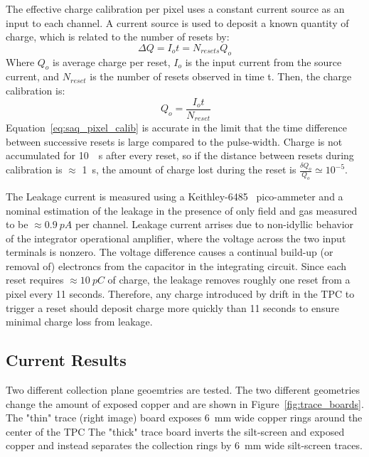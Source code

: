 The effective charge calibration per pixel uses a constant current source as an input to each channel.
A current source is used to deposit a known quantity of charge, which is related to the number of resets by:
\begin{equation}
 \Delta Q = I_{o}t = N_{resets}Q_{o}
\end{equation}
Where $Q_{o}$ is average charge per reset, $I_{o}$ is the input current from the source current, and $N_{reset}$ is the number of resets observed in time t.
Then, the charge calibration is:
\begin{equation}~\label{eq:saq_pixel_calib}
 Q_{o} = \frac{I_{o}t}{N_{reset}}
\end{equation}
Equation~\ref{eq:saq_pixel_calib} is accurate in the limit that the time difference between successive resets is large compared to the pulse-width.
Charge is not accumulated for 10~\unit{\mu s} after every reset, so if the distance between resets during calibration is $\approx$ 1~\unit{s}, the amount of charge lost during the reset is $\frac{\delta Q_{o}}{Q_{o}} \simeq 10^{-5}$.

The Leakage current is measured using a Keithley-6485~\citep{picoammeter-6485-datasheet} pico-ammeter and a nominal estimation of the leakage in the presence of only field and gas measured to be $\approx 0.9~\unit{pA}$ per channel.
Leakage current arrises due to non-idyllic behavior of the integrator operational amplifier, where the voltage across the two input terminals is nonzero.
The voltage difference causes a continual build-up (or removal of) electroncs from the capacitor in the integrating circuit.
Since each reset requires $\approx 10~\unit{pC}$ of charge, the leakage removes roughly one reset from a pixel every 11 seconds.
Therefore, any charge introduced by drift in the TPC to trigger a reset should deposit charge more quickly than 11 seconds to ensure minimal charge loss from leakage.


\subsection{Current Results}

Two different collection plane geoemtries are tested.
The two different geometries change the amount of exposed copper and are shown in Figure~\ref{fig:trace_boards}.
The "thin" trace (right image) board exposes 6~\unit{mm} wide copper rings around the center of the TPC
The "thick" trace board inverts the silt-screen and exposed copper and instead separates the collection rings by 6~\unit{mm} wide silt-screen traces.

